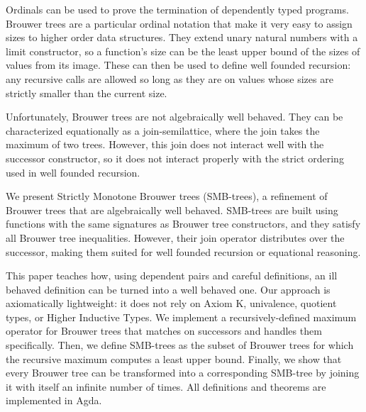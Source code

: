 
Ordinals can be used to prove the termination of dependently typed programs.
Brouwer trees are a particular ordinal notation that
make it very easy to assign sizes to higher order data structures.
They extend unary natural numbers with a limit constructor,
so a function's size can be the least upper bound of the sizes of values from its image.
These can then be used to define well founded recursion: any recursive calls are allowed
so long as they are on values whose sizes are strictly smaller than the current size.

Unfortunately, Brouwer trees are not algebraically well behaved.
They can be characterized equationally as a join-semilattice, where the join takes the maximum
of two trees. However, this join does not interact well with
the successor constructor, so it does not interact properly with
the strict ordering used in well founded recursion.

We present Strictly Monotone Brouwer trees (SMB-trees), a refinement of Brouwer trees
that are algebraically well behaved. SMB-trees are built using functions with the same
signatures as Brouwer tree constructors, and they satisfy all Brouwer tree inequalities.
However,  their join operator distributes over the successor, making them
suited for well founded recursion or equational reasoning.

This paper teaches how, using dependent pairs and careful definitions, an ill behaved
definition can be turned into a well behaved one.
Our approach is axiomatically lightweight:
it does not rely on Axiom K, univalence, quotient types, or Higher Inductive Types.
We implement a recursively-defined maximum operator for Brouwer trees that matches
on successors and handles them specifically.
Then, we define SMB-trees as the subset of Brouwer trees for which the recursive maximum
computes a least upper bound.
Finally, we show that every Brouwer tree can be transformed into a corresponding SMB-tree
by joining it with itself an infinite number of times.
All definitions and theorems are implemented in Agda.
